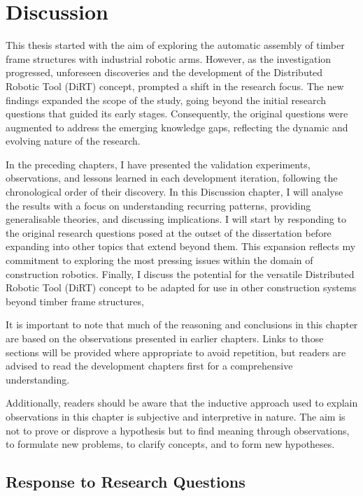 \documentclass[11pt]{book}
\begin{document}
\section{Discussion}

This thesis started with the aim of exploring the automatic assembly of timber frame structures with industrial robotic arms. However, as the investigation progressed, unforeseen discoveries and the development of the Distributed Robotic Tool (DiRT) concept, prompted a shift in the research focus. The new findings expanded the scope of the study, going beyond the initial research questions that guided its early stages. Consequently, the original questions were augmented to address the emerging knowledge gaps, reflecting the dynamic and evolving nature of the research.

In the preceding chapters, I have presented the validation experiments, observations, and lessons learned in each development iteration, following the chronological order of their discovery. In this Discussion chapter, I will analyse the results with a focus on understanding recurring patterns, providing generalisable theories, and discussing implications. I will start by responding to the original research questions posed at the outset of the dissertation before expanding into other topics that extend beyond them. This expansion reflects my commitment to exploring the most pressing issues within the domain of construction robotics. Finally, I discuss the potential for the versatile Distributed Robotic Tool (DiRT) concept to be adapted for use in other construction systems beyond timber frame structures,

It is important to note that much of the reasoning and conclusions in this chapter are based on the observations presented in earlier chapters. Links to those sections will be provided where appropriate to avoid repetition, but readers are advised to read the development chapters first for a comprehensive understanding.

Additionally, readers should be aware that the inductive approach used to explain observations in this chapter is subjective and interpretive in nature. The aim is not to prove or disprove a hypothesis but to find meaning through observations, to formulate new problems, to clarify concepts, and to form new hypotheses.

\subsection{Response to Research Questions}
\end{document}

